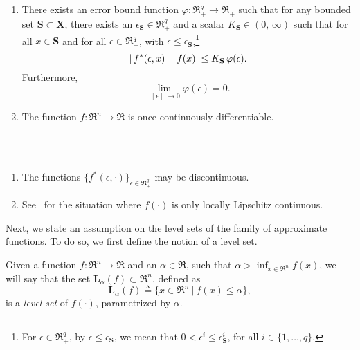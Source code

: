 \begin{assumption} ~\\
\\[-2.5\baselineskip]
\begin{enumerate}
\item There exists an error bound function $\varphi \colon \Re_+^q
  \to \Re_+$ such that for any bounded set $\mathbf S \subset \mathbf
  X$, there exists an $\epsilon_{\mathbf S} \in \Re_+^q$ and a scalar 
  $K_{\mathbf S} \in
  (0, \, \infty)$ such that for all $x \in \mathbf S$ and for all
  $\epsilon \in \Re_+^q$, 
with $\epsilon \le \epsilon_{\mathbf S}$,\footnote{For 
$\epsilon \in \Re_+^q$, by $\epsilon \le 
\epsilon_{\mathbf S}$, 
we mean that $0 < \epsilon^i \le \epsilon_{\mathbf S}^i$, for all 
$i \in \{ 1, \ldots ,q \}$.}
  \begin{equation}
    | \, f^*(\epsilon,x) - f(x) | \le K_{\mathbf S} \, \varphi(\epsilon).
  \lab{eq:fefPhi}
  \end{equation}
Furthermore, 
\begin{equation}
\lim_{\| \epsilon \| \to 0} \varphi(\epsilon) = 0.
\end{equation}
\item  The function $f \colon \Re^n \to \Re$ is once continuously differentiable.
\rbox
\end{enumerate}
\end{assumption}

\begin{remark}~\\
\\[-2.5\baselineskip] {\em
\begin{enumerate}
\item
The functions $\{ f^*(\epsilon,\cdot) \}_{\epsilon \in \Re_+^q}$ may be
discontinuous.
\item
See~\cite{PolakWetter2003:1} for the situation where $f(\cdot)$ is
only locally Lipschitz continuous.
\rbox
\end{enumerate}
}
\end{remark}

Next, we state an assumption on the level sets of the family of
approximate functions. To do so, we first define the notion of a level 
set.

\begin{definition}
Given a function $f \colon \Re^n \to \Re$ and an $\alpha \in
\Re$, such that $\alpha > \inf_{x \in \Re^n} f(x)$, we will say that
the set $\mathbf L_\alpha (f) \subset \Re^n$, defined as
\begin{equation}
  \mathbf L_\alpha(f) \triangleq \{ x \in \Re^n \ | \  f(x) \le \alpha \}, 
\end{equation}
 is a {\em level set} of $f(\cdot)$, parametrized by $\alpha$.
\rbox
\end{definition}

